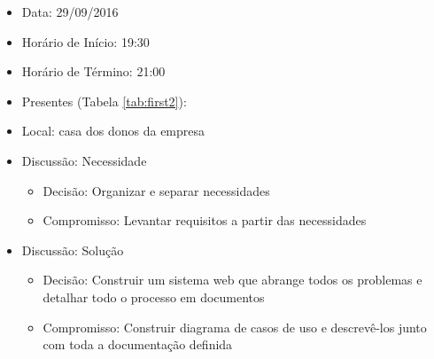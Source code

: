 \begin{itemize}
\item Data: 29/09/2016	
\item Horário de Início: 19:30	
\item Horário de Término: 21:00
\item Presentes (Tabela \ref{tab:first2}):
\begin{table}[!h]
\centering
\caption{Pessoas presentes na segunda reunião}
\label{tab:first2}
\end{table}
\item Local: casa dos donos da empresa
\item Discussão: Necessidade
\begin{itemize}
\item Decisão: Organizar e separar necessidades
\item Compromisso: Levantar requisitos a partir das necessidades
\end{itemize}
\item Discussão: Solução
\begin{itemize}
\item Decisão: Construir um sistema web que abrange todos os problemas e detalhar todo o processo em documentos
\item Compromisso: Construir diagrama de casos de uso e descrevê-los junto com toda a documentação definida
\end{itemize}
\end{itemize}


